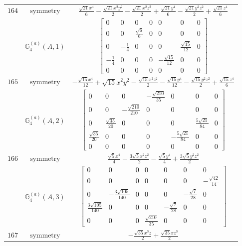 \documentclass[fleqn,8pt,landscape]{jsarticle}
\begin{document}
\begin{longtable}{ccc}
$ 164 $ & $ \text{symmetry} $ & $ \frac{\sqrt{21} x^{4}}{6} - \frac{\sqrt{21} x^{2} y^{2}}{2} - \frac{\sqrt{21} x^{2} z^{2}}{2} + \frac{\sqrt{21} y^{4}}{6} - \frac{\sqrt{21} y^{2} z^{2}}{2} + \frac{\sqrt{21} z^{4}}{6} $ \\
$  $ & $ \mathbb{G}_{4}^{(a)}(A,1) $ & $ \begin{bmatrix} 0 & 0 & 0 & 0 & 0 & 0 & 0 \\ 0 & 0 & \frac{\sqrt{6}}{6} & 0 & 0 & 0 & 0 \\ 0 & - \frac{1}{4} & 0 & 0 & 0 & \frac{\sqrt{15}}{12} & 0 \\ - \frac{1}{4} & 0 & 0 & 0 & - \frac{\sqrt{15}}{12} & 0 & 0 \\ 0 & 0 & 0 & 0 & 0 & 0 & 0 \end{bmatrix} $ \\ \hline
$ 165 $ & $ \text{symmetry} $ & $ - \frac{\sqrt{15} x^{4}}{12} + \sqrt{15} x^{2} y^{2} - \frac{\sqrt{15} x^{2} z^{2}}{2} - \frac{\sqrt{15} y^{4}}{12} - \frac{\sqrt{15} y^{2} z^{2}}{2} + \frac{\sqrt{15} z^{4}}{6} $ \\
$  $ & $ \mathbb{G}_{4}^{(a)}(A,2) $ & $ \begin{bmatrix} 0 & 0 & 0 & - \frac{\sqrt{210}}{35} & 0 & 0 & 0 \\ 0 & 0 & - \frac{\sqrt{210}}{210} & 0 & 0 & 0 & 0 \\ 0 & \frac{\sqrt{35}}{20} & 0 & 0 & 0 & \frac{5 \sqrt{21}}{84} & 0 \\ \frac{\sqrt{35}}{20} & 0 & 0 & 0 & - \frac{5 \sqrt{21}}{84} & 0 & 0 \\ 0 & 0 & 0 & 0 & 0 & 0 & 0 \end{bmatrix} $ \\ \hline
$ 166 $ & $ \text{symmetry} $ & $ \frac{\sqrt{5} x^{4}}{4} - \frac{3 \sqrt{5} x^{2} z^{2}}{2} - \frac{\sqrt{5} y^{4}}{4} + \frac{3 \sqrt{5} y^{2} z^{2}}{2} $ \\
$  $ & $ \mathbb{G}_{4}^{(a)}(A,3) $ & $ \begin{bmatrix} 0 & 0 & 0 & 0 & 0 & 0 & 0 \\ 0 & 0 & 0 & 0 & 0 & 0 & - \frac{\sqrt{42}}{14} \\ 0 & - \frac{3 \sqrt{105}}{140} & 0 & 0 & 0 & - \frac{\sqrt{7}}{28} & 0 \\ \frac{3 \sqrt{105}}{140} & 0 & 0 & 0 & - \frac{\sqrt{7}}{28} & 0 & 0 \\ 0 & 0 & 0 & \frac{\sqrt{210}}{35} & 0 & 0 & 0 \end{bmatrix} $ \\ \hline
$ 167 $ & $ \text{symmetry} $ & $ - \frac{\sqrt{35} x^{3} z}{2} + \frac{\sqrt{35} x z^{3}}{2} $ \\

\end{longtable}
\end{document}
